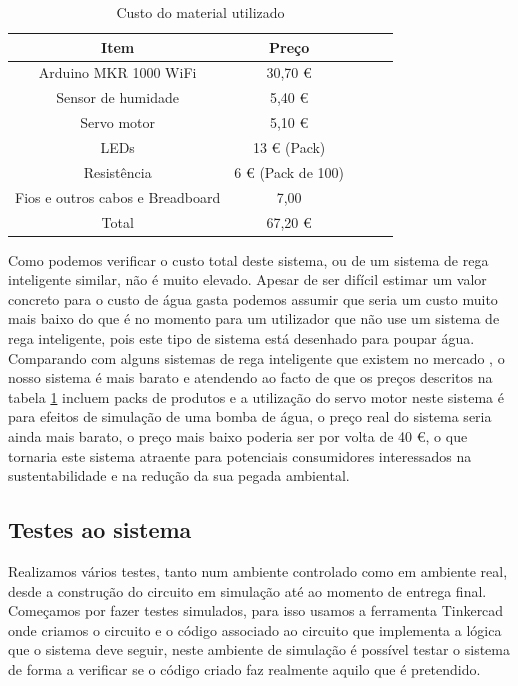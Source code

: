\documentclass[conference]{IEEEtran}
\begin{document}
\begin{table}[ht]
\centering
\small
\begin{tabular}{|c|c|c|c|c|}
    \hline
    \rowcolor{gray}
    \color{white}Item & \color{white}Preço \\
    \hline
    Arduino MKR 1000 WiFi & 30,70 € \\
    \hline
    Sensor de humidade & 5,40 € \\
    \hline
    Servo motor & 5,10 € \\
    \hline
    LEDs & 13 € (Pack) \\
    \hline
    Resistência & 6 € (Pack de 100) \\
    \hline
    Fios e outros cabos e Breadboard & 7,00 \\
    \hline
    \rowcolor{gray}
    \color{white}Total & \color{white}67,20 € \\
    \hline
\end{tabular}
\vspace{1em}
\caption{Custo do material utilizado}
\label{pricetable}
\end{table}

Como podemos verificar o custo total deste sistema, ou de um sistema de
rega inteligente similar, não é muito elevado. Apesar de ser difícil estimar
um valor concreto para o custo de água gasta podemos assumir que seria um custo
muito mais baixo do que é no momento para um utilizador que não use um sistema de
rega inteligente, pois este tipo de sistema está desenhado para poupar água.
Comparando com alguns sistemas de rega inteligente que existem no
mercado \cite{amazonOrbit} \cite{amazonNetro}, o nosso sistema é mais barato e
atendendo ao facto de que os preços descritos na tabela \ref{pricetable} incluem packs de
produtos e a utilização do servo motor neste sistema é para efeitos de simulação
de uma bomba de água, o preço real do sistema seria ainda mais barato, o preço mais
baixo poderia ser por volta de 40 €, o que tornaria este sistema atraente para
potenciais consumidores interessados na sustentabilidade e na redução da sua pegada
ambiental.

\subsection{Testes ao sistema}

Realizamos vários testes, tanto num ambiente controlado como em ambiente real, desde
a construção do circuito em simulação até ao momento de entrega final. Começamos
por fazer testes simulados, para isso usamos a ferramenta Tinkercad \cite{tinkercad} onde
criamos o circuito e o código associado ao circuito que implementa a lógica
que o sistema deve seguir, neste ambiente de simulação é possível testar
o sistema de forma a verificar se o código criado faz realmente aquilo
que é pretendido.
\end{document}
